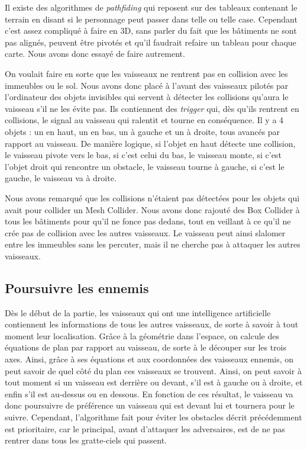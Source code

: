 \documentclass[12pt, titlepage]{article}
\begin{document}
\begin{spacing}{1.5}
Il existe des algorithmes de \textit{pathfiding} qui reposent sur des tableaux contenant le terrain en disant si le personnage peut passer dans telle ou telle case. Cependant c'est assez compliqué à faire en 3D, sans parler du fait que les bâtiments ne sont pas alignés, peuvent être pivotés et qu'il faudrait refaire un tableau pour chaque carte. Nous avons donc essayé de faire autrement.

On voulait faire en sorte que les vaisseaux ne rentrent pas en collision avec les immeubles ou le sol. Nous avons donc placé à l'avant des vaisseaux pilotés par l'ordinateur des objets invisibles qui servent à détecter les collisions qu'aura le vaisseau s'il ne les évite pas. Ils contiennent des \textit{trigger} qui, dès qu'ils rentrent en collisions, 
le signal au vaisseau qui ralentit et tourne en conséquence. Il y a 4 objets : un en haut, un en bas, un à gauche et un à droite, tous avancés par rapport au vaisseau. De manière logique, si l'objet en haut détecte une collision, le vaisseau pivote vers le bas, si c'est celui du bas, le vaisseau monte, si c'est l'objet droit qui rencontre un obstacle, le vaisseau tourne à gauche, si c'est le gauche, le vaisseau va à droite.

Nous avons remarqué que les collisions n'étaient pas détectées pour les objets qui avait pour collider un Mesh Collider. Nous avons  donc rajouté des Box Collider à tous les bâtiments pour qu’il ne fonce pas dedans, tout en veillant à ce qu'il ne crée  pas de collision avec les autres vaisseaux. Le vaisseau peut ainsi slalomer entre les immeubles sans les percuter, mais il ne cherche pas à attaquer les autres vaisseaux.

\subsection{Poursuivre les ennemis}

Dès le début de la partie, les vaisseaux qui ont une intelligence artificielle contiennent les informations de tous les autres vaisseaux, de sorte à savoir à tout moment leur localisation. Grâce à la géométrie dans l'espace, on calcule des équations de plan par rapport au vaisseau, de sorte à le découper sur les trois axes. Ainsi, grâce à ses équations et aux coordonnées des vaisseaux ennemis, on peut savoir de quel côté du plan ces vaisseaux se trouvent. Ainsi, on peut savoir à tout moment si un vaisseau est derrière ou devant, s'il est à gauche ou à droite, et enfin s'il est au-dessus ou en dessous. En fonction de ces résultat, le vaisseau va donc poursuivre de préférence un vaisseau qui est devant lui et tournera pour le suivre. Cependant, l'algorithme fait pour éviter les obstacles décrit précédemment est prioritaire, car le principal, avant d'attaquer les adversaires, est de ne pas rentrer dans tous les gratte-ciels qui passent.


\end{spacing}
\end{document}
